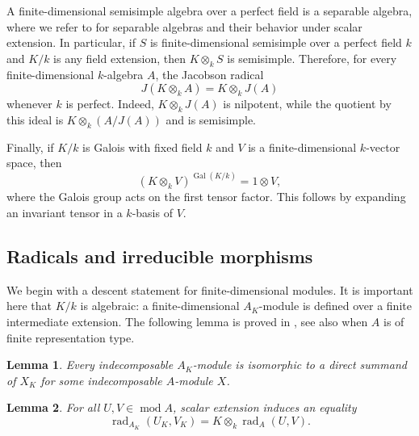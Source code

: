 \documentclass[11pt,letterpaper,reqno]{amsart}
\newtheorem{lemma}[lemma]{Lemma}
\theoremstyle{definition}
\DeclareMathOperator{\Gal}{Gal}
\DeclareMathOperator{\rad}{rad}
\newcommand{\modcat}{\operatorname{mod}}
\begin{document}
A finite-dimensional semisimple algebra over a perfect field is a separable
algebra, where we refer
to \cite{DeMeyerIngraham,Pierce} for separable algebras and their behavior
under scalar extension. In particular, if $S$ is finite-dimensional semisimple over a
perfect field $k$ and $K/k$ is any field extension, then $K\otimes_kS$ is
semisimple. Therefore, for every finite-dimensional $k$-algebra $A$, the Jacobson radical
\begin{equation}\label{eq:jacobson-base-change-prelim}
J(K\otimes_kA)=K\otimes_kJ(A)
\end{equation}
whenever $k$ is perfect.  Indeed, $K\otimes_kJ(A)$ is nilpotent, while the
quotient by this ideal is $K\otimes_k(A/J(A))$ and is semisimple.  

Finally, if $K/k$ is Galois with fixed field $k$ and $V$ is a
finite-dimensional $k$-vector space, then
\begin{equation}\label{eq:galois-invariants-tensor}
(K\otimes_kV)^{\Gal(K/k)}=1\otimes V,
\end{equation}
where the Galois group acts on the first tensor factor.  This follows by
expanding an invariant tensor in a $k$-basis of $V$.


\subsection{Radicals and irreducible morphisms}
\label{subsec:radical-base-change}

We begin with a descent statement for finite-dimensional modules.  It is
important here that $K/k$ is algebraic: a finite-dimensional $A_K$-module is
defined over a finite intermediate extension. The following lemma is proved in \cite[Proposition 4.13]{Kasjan}, see also \cite[Theorem 3.3]{JensenLenzing} when $A$ is of finite representation type.

\begin{lemma}\label{lem:descent-summand}
Every indecomposable $A_K$-module is isomorphic to a direct summand of
$X_K$ for some indecomposable $A$-module $X$.
\end{lemma}

\begin{lemma}\label{lem:radical-base-change}
For all $U,V\in\modcat A$, scalar extension induces an equality
\begin{equation}\label{eq:radical-base-change}
\rad_{A_K}(U_K,V_K)=K\otimes_k\rad_A(U,V).
\end{equation}
\end{lemma}
\end{document}
